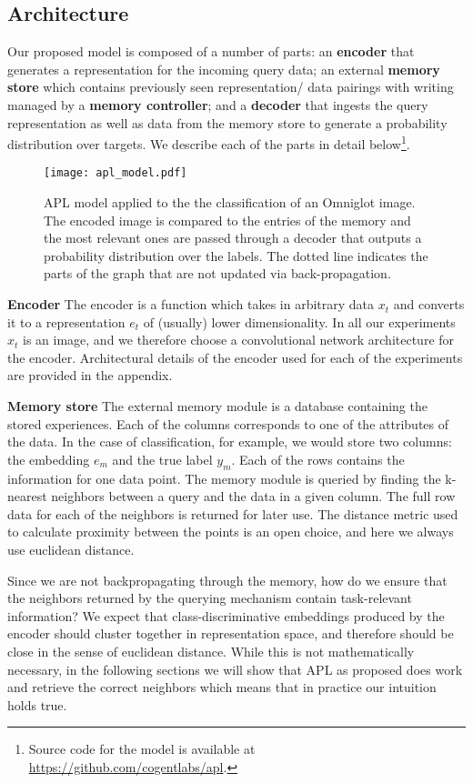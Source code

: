 \documentclass{article} \usepackage{iclr2019_conference,times}
\begin{document}
\subsection{Architecture}
Our proposed model is composed of a number of parts: an \textbf{encoder} that generates a representation for the incoming query data; an external \textbf{memory store} which contains previously seen representation/ data pairings with writing managed by a \textbf{memory controller}; and a \textbf{decoder} that ingests the query representation as well as data from the memory store to generate a probability distribution over targets. We describe each of the parts in detail below\footnote{Source code for the model is available at \url{https://github.com/cogentlabs/apl}.}.

\begin{figure}[ht]
\begin{center}
\texttt{[image: apl\_model.pdf]}
\end{center}
\caption{APL model applied to the the classification of an Omniglot image. The encoded image is compared to the entries of the memory and the most relevant ones are passed through a decoder that outputs a probability distribution over the labels. The dotted line indicates the parts of the graph that are not updated via back-propagation.}
\end{figure}

\textbf{Encoder} The encoder is a function which takes in arbitrary data $x_t$ and converts it to a representation $e_t$ of (usually) lower dimensionality. In all our experiments $x_t$ is an image, and we therefore choose a convolutional network architecture for the encoder. Architectural details of the encoder used for each of the experiments are provided in the appendix.

\textbf{Memory store} The external memory module is a database containing the stored experiences. Each of the columns corresponds to one of the attributes of the data. In the case of classification, for example, we would store two columns: the embedding ${e_m}$ and the true label ${y_m}$. Each of the rows contains the information for one data point. The memory module is queried by finding the k-nearest neighbors between a query and the data in a given column. The full row data for each of the neighbors is returned for later use. The distance metric used to calculate proximity between the points is an open choice, and here we always use euclidean distance.

Since we are not backpropagating through the memory, how do we ensure that the neighbors returned by the querying mechanism contain task-relevant information? We expect that class-discriminative embeddings produced by the encoder should cluster together in representation space, and therefore should be close in the sense of euclidean distance. While this is not mathematically necessary, in the following sections we will show that APL as proposed does work and retrieve the correct neighbors which means that in practice our intuition holds true.
\end{document}
